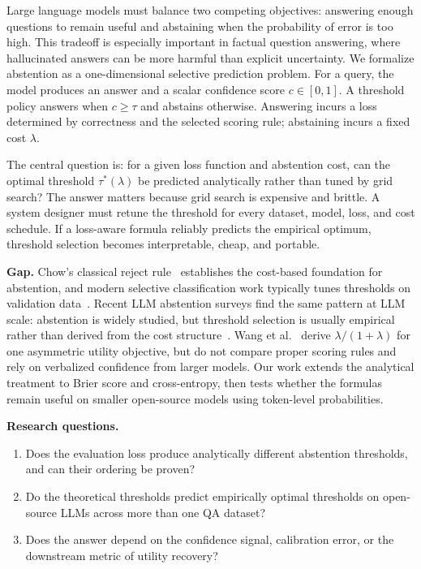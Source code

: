 \documentclass[letterpaper,10pt,twocolumn]{article}
\begin{document}
Large language models must balance two competing objectives: answering enough
questions to remain useful and abstaining when the probability of error is too
high. This tradeoff is especially important in factual question answering,
where hallucinated answers can be more harmful than explicit uncertainty. We
formalize abstention as a one-dimensional selective prediction problem. For a
query, the model produces an answer and a scalar confidence score
$c\in[0,1]$. A threshold policy answers when $c\geq\tau$ and abstains
otherwise. Answering incurs a loss determined by correctness and the selected
scoring rule; abstaining incurs a fixed cost $\lambda$.

The central question is: for a given loss function and abstention cost, can
the optimal threshold $\tau^\ast(\lambda)$ be predicted analytically rather
than tuned by grid search? The answer matters because grid search is expensive
and brittle. A system designer must retune the threshold for every dataset,
model, loss, and cost schedule. If a loss-aware formula reliably predicts the
empirical optimum, threshold selection becomes interpretable, cheap, and
portable.

\textbf{Gap.} Chow's classical reject rule~\cite{chow1970} establishes the
cost-based foundation for abstention, and modern selective classification
work typically tunes thresholds on validation data~\cite{geifman2017}. Recent
LLM abstention surveys find the same pattern at LLM scale: abstention is
widely studied, but threshold selection is usually empirical rather than
derived from the cost structure~\cite{wen2025}. Wang et al.~\cite{wang2026}
derive $\lambda/(1+\lambda)$ for one asymmetric utility objective, but do not
compare proper scoring rules and rely on verbalized confidence from larger
models. Our work extends the analytical treatment to Brier score and
cross-entropy, then tests whether the formulas remain useful on smaller
open-source models using token-level probabilities.

\textbf{Research questions.}
\begin{enumerate}
    \item Does the evaluation loss produce analytically different abstention
    thresholds, and can their ordering be proven?
    \item Do the theoretical thresholds predict empirically optimal thresholds
    on open-source LLMs across more than one QA dataset?
    \item Does the answer depend on the confidence signal, calibration error,
    or the downstream metric of utility recovery?
\end{enumerate}
\end{document}
